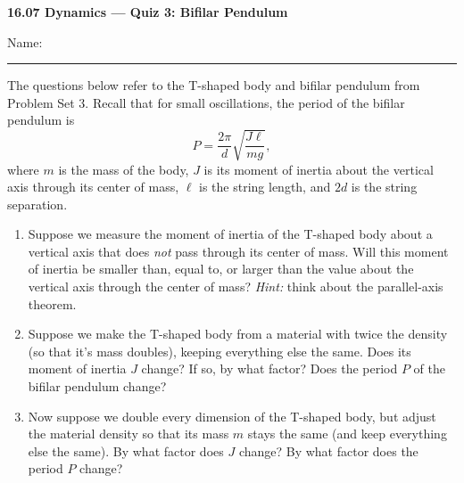 \documentclass[11pt,letterpaper]{article}
\begin{document}
\begin{center}
    {\Large \textbf{16.07 Dynamics --- Quiz 3: Bifilar Pendulum}}
\end{center}

\vspace{4pt}

Name: \rule{3.2in}{0.4pt}

\vspace{14pt}
The questions below refer to the T-shaped body and bifilar pendulum from Problem Set 3. Recall that for small oscillations, the period of the bifilar pendulum is
\[
P = \frac{2\pi}{d}\sqrt{\frac{J\ell}{mg}},
\]
where $m$ is the mass of the body, $J$ is its moment of inertia about the vertical axis through its center of mass, $\ell$ is the string length, and $2d$ is the string separation.

\vspace{10pt}
\begin{enumerate}[label=\textbf{\arabic*.}, leftmargin=*, itemsep=4pt, series=quiz]

\item Suppose we measure the moment of inertia of the T-shaped body about a vertical axis that does \emph{not} pass through its center of mass. Will this moment of inertia be smaller than, equal to, or larger than the value about the vertical axis through the center of mass? \emph{Hint:} think about the parallel-axis theorem.
\vspace{1.1in}

\item Suppose we make the T-shaped body from a material with twice the density (so that it's mass doubles), keeping everything else the same. Does its moment of inertia $J$ change? If so, by what factor? Does the period $P$ of the bifilar pendulum change?
\vspace{2.0in}

\item Now suppose we double every dimension of the T-shaped body, but adjust the material density so that its mass $m$ stays the same (and keep everything else the same). By what factor does $J$ change? By what factor does the period $P$ change?
\vspace{2.0in}


\vspace*{\fill}

\end{enumerate}
\end{document}
